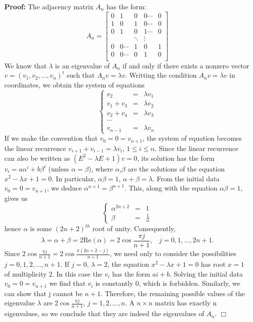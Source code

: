 \documentclass[11pt]{article}
\newenvironment{proof}{\noindent \textbf{Proof:}}{$\Box$}
\begin{document}
\begin{proof}
The adjacency matrix $A_n$ has the form:
$$A_n=
\begin{bmatrix}
0&1&0&0\cdots&0\\
1&0&1&0\cdots&0\\
0&1&0&1\cdots&0\\
&&\ddots&\vdots\\
0&0\cdots&1&0&1\\
0&0\cdots&0&1&0\\
\end{bmatrix}$$
We know that $\lambda$ is an eigenvalue of $A_n$ if and only if there exists a nonzero vector $v=(v_1,v_2,...,v_n)^t$ such that $A_nv=\lambda v$. Writting the condition $A_nv=\lambda v$ in coordinates, we obtain the system of equations
$$\left\{ \begin{array}{ccc}
v_2 & = &\lambda v_1 \\
v_1+v_3 & = & \lambda v_2\\
v_2+v_4 & = & \lambda v_3\\
\cdots\\
v_{n-1} & = & \lambda v_n
\end{array} \right.$$
If we make the convention that $v_0=0=v_{n+1}$, the system of equation becomes the linear recurrence $v_{i+1}+v_{i-1}=\lambda v_i$, $1 \leq i \leq n$. Since the linear recurrence can also be written as $(E^2-\lambda E+1)v=0$, its solution has the form $v_i=a\alpha^i+b\beta^i$ (unless $\alpha=\beta$), where $\alpha$,$\beta$ are the solutions of the equation $x^2-\lambda x+1=0$. In particular, $\alpha\beta=1$, $\alpha+\beta=\lambda$. From the initial data $v_0=0=v_{n+1}$, we deduce $\alpha^{n+1}=\beta^{n+1}$. This, along with the equation $\alpha\beta=1$, gives us
$$\left\{ \begin{array}{ccc}
\alpha^{2n+2}& = & 1\\
\beta & = & \frac{1}{\alpha}
\end{array} \right.$$
hence $\alpha$ is some ${(2n+2)}^{th}$ root of unity. Consequently,
\[ \lambda=\alpha+\beta=2\mathrm{Re}(\alpha)=2\cos{\frac{\pi j}{n+1}}, ~~~~j=0,1,...,2n+1. \]
Since $2\cos{\frac{\pi j}{n+1}}=2\cos{\frac{\pi (2n+2-j)}{n+1}}$, we need only to consider the possibilities $j=0,1,2,...,n+1$. If $j=0$, $\lambda = 2$, the equation $x^2-\lambda x+1=0$ has root $x=1$ of multiplicity 2. In this case the $v_i$ has the form $ai+b$. Solving the initial data $v_0=0=v_{n+1}$ we find that $v_i$ is constantly 0, which is forbidden. Similarly, we can show that j cannot be $n+1$. Therefore, the remaining possible values of the eigenvalue $\lambda$ are $2\cos{\frac{\pi j}{n+1}}$, $j=1,2,...,n$. A $n\times n$ matrix has exactly n eigenvalues, so we conclude that they are indeed the eigenvalues of $A_n$.
\end{proof}
\end{document}
